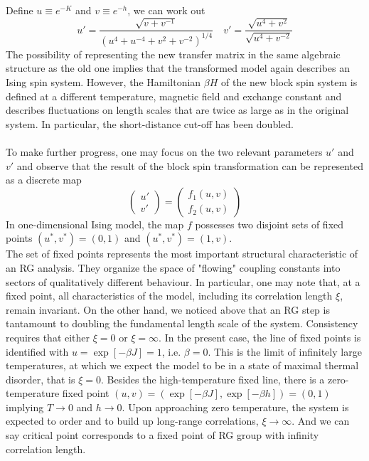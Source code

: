 Define $u \equiv e^{-K}$ and $v \equiv e^{-h}$, we can work out
\[u' = \frac{\sqrt{v+v^{-1}}}{(u^4 + u^{-4} + v^2 + v^{-2})^{1/4}} \quad v' = \frac{\sqrt{u^4 + v^2}}{\sqrt{u^4 + v^{-2}}}\]
The possibility of representing the new transfer matrix in the same algebraic structure as the old one implies that the transformed model again describes an Ising spin system. However, the Hamiltonian $\beta H$ of the new block spin system is defined at a different temperature, magnetic field and exchange constant and describes fluctuations on length scales that are twice as large as in the original system.
In particular, the short-distance cut-off has been doubled.
\\ \\
To make further progress, one may focus on the two relevant parameters $u'$ and $v'$ and observe that the result of the block spin transformation can be represented as a discrete map
\[\begin{pmatrix} u' \\ v' \end{pmatrix} = \begin{pmatrix}
f_1(u,v) \\ f_2(u,v)
\end{pmatrix} \]
In one-dimensional Ising model, the map $f$ possesses two
disjoint sets of fixed points $(u^*,v^*) = (0,1)$ and $(u^*,v^*) = (1,v)$.
\\
The set of fixed points represents the most important structural characteristic of an RG analysis. They organize the space of "flowing" coupling constants into sectors of qualitatively different behaviour. 
In particular, one may note that, at a fixed point, all characteristics of the model, including its correlation length $\xi$, remain invariant. 
On the other hand, we noticed above that an RG step is tantamount to doubling the fundamental length scale of the system. Consistency requires that either $\xi = 0$ or $\xi = \infty$. 
In the present case, the line of fixed points is identified with $u = \exp[-\beta J] = 1$, i.e. $\beta = 0$. 
This is the limit of infinitely large temperatures, at which we expect the model to be in a state of maximal thermal disorder, that is $\xi = 0$. 
Besides the high-temperature fixed line, there is a zero-temperature fixed point $(u, v) = (\exp[−\beta J], \exp[−\beta h]) = (0, 1)$ implying $T \to 0$ and $h \to 0$. Upon approaching zero temperature, the system is expected to order and to build up long-range correlations, $\xi \to \infty$. And we can say critical point corresponds to a fixed point of RG group with infinity correlation length.
